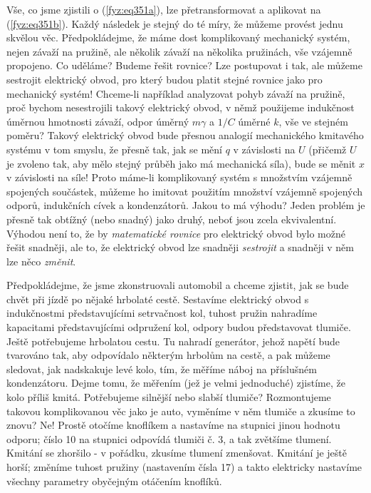     Vše, co jsme zjistili o (\ref{fyz:eq351a}), lze přetransformovat a aplikovat na 
    (\ref{fyz:eq351b}). Každý následek je stejný do té míry, že můžeme provést jednu skvělou věc. 
    Předpokládejme, že máme dost komplikovaný mechanický systém, nejen závaží na pružině, ale 
    několik závaží na několika pružinách, vše vzájemně propojeno. Co uděláme? Budeme řešit rovnice? 
    Lze postupovat i tak, ale můžeme sestrojit elektrický obvod, pro který budou platit stejné 
    rovnice jako pro mechanický systém! Chceme-li například analyzovat pohyb závaží na pružině, 
    proč bychom nesestrojili takový elektrický obvod, v němž použijeme indukčnost úměrnou hmotnosti 
    závaží, odpor úměrný \(m\gamma\) a \(1/C\) úměrné \(k\), vše ve stejném poměru? Takový 
    elektrický obvod bude přesnou analogií mechanického kmitavého systému v tom smyslu, že přesně 
    tak, jak se mění \(q\) v závislosti na \(U\) (přičemž \(U\) je zvoleno tak, aby mělo stejný 
    průběh jako má mechanická síla), bude se měnit \(x\) v závislosti na síle! Proto máme-li 
    komplikovaný systém s množstvím vzájemně spojených součástek, můžeme ho imitovat použitím 
    množství vzájemně spojených odporů, indukčních cívek a kondenzátorů. Jakou to má výhodu? Jeden 
    problém je přesně tak obtížný (nebo snadný) jako druhý, neboť jsou zcela ekvivalentní. Výhodou 
    není to, že by \emph{matematické rovnice} pro elektrický obvod bylo možné řešit snadněji, ale 
    to, že elektrický obvod lze snadněji \emph{sestrojit} a snadněji v něm lze něco \emph{změnit}.
    
    Předpokládejme, že jsme zkonstruovali automobil a chceme zjistit, jak se bude chvět při jízdě 
    po nějaké hrbolaté cestě. Sestavíme elektrický obvod s indukčnostmi představujícími setrvačnost 
    kol, tuhost pružin nahradíme kapacitami představujícími odpružení kol, odpory budou 
    představovat tlumiče. Ještě potřebujeme hrbolatou cestu. Tu nahradí generátor, jehož napětí 
    bude tvarováno tak, aby odpovídalo některým hrbolům na cestě, a pak můžeme sledovat, jak 
    nadskakuje levé kolo, tím, že měříme náboj na příslušném kondenzátoru. Dejme tomu, že měřením 
    (jež je velmi jednoduché) zjistíme, že kolo příliš kmitá. Potřebujeme silnější nebo slabší 
    tlumiče? Rozmontujeme takovou komplikovanou věc jako je auto, vyměníme v něm tlumiče a zkusíme 
    to znovu? Ne! Prostě otočíme knoflíkem a nastavíme na stupnici jinou hodnotu odporu; číslo 10 
    na stupnici odpovídá tlumiči č. 3, a tak zvětšíme tlumení. Kmitání se zhoršilo - v pořádku, 
    zkusíme tlumení zmenšovat. Kmitání je ještě horší; změníme tuhost pružiny (nastavením čísla 17) 
    a takto elektricky nastavíme všechny parametry obyčejným otáčením knoflíků. 
    
